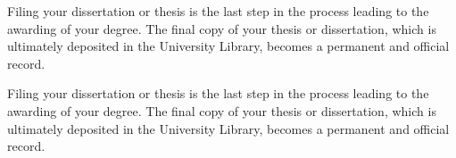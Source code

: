Filing your dissertation or thesis is the last step in the process leading to the awarding of your degree. The final copy of your thesis or dissertation, which is ultimately deposited in the University Library, becomes a permanent and official record.

Filing your dissertation or thesis is the last step in the process leading to the awarding of your degree. The final copy of your thesis or dissertation, which is ultimately deposited in the University Library, becomes a permanent and official record.

